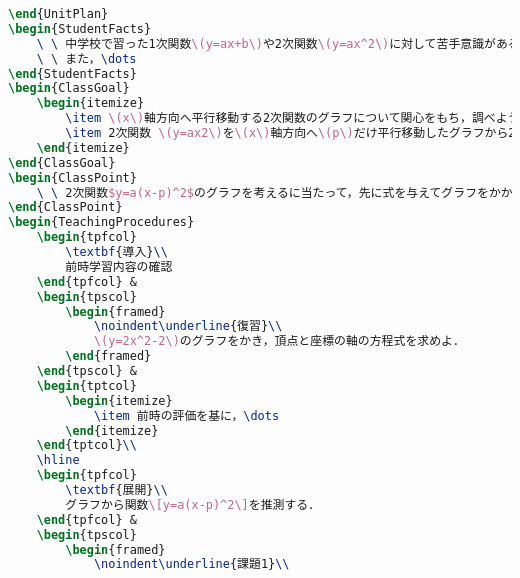 \documentclass[paper=a4,fontsize=10.5pt]{jlreq}
\begin{document}
\begin{lstlisting}[language=TeX]
\end{UnitPlan}
\begin{StudentFacts}
    \ \ 中学校で習った1次関数\(y=ax+b\)や2次関数\(y=ax^2\)に対して苦手意識がある生徒が多く，グラフをかくことができない，関数とグラフの関係が分からないという生徒もいる．\par
    \ \ また，\dots
\end{StudentFacts}
\begin{ClassGoal}
    \begin{itemize}
        \item \(x\)軸方向へ平行移動する2次関数のグラフについて関心をもち，調べようとする．\fbox{C1}
        \item 2次関数 \(y=ax2\)を\(x\)軸方向へ\(p\)だけ平行移動したグラフから2次関数の式を考察できる．\fbox{B1}
    \end{itemize}
\end{ClassGoal}
\begin{ClassPoint}
    \ \ 2次関数$y=a(x-p)^2$のグラフを考えるに当たって，先に式を与えてグラフをかかせることが一般的であるが，\dots
\end{ClassPoint}
\begin{TeachingProcedures}
    \begin{tpfcol}
        \textbf{導入}\\
        前時学習内容の確認
    \end{tpfcol} &
    \begin{tpscol}
        \begin{framed}
            \noindent\underline{復習}\\
            \(y=2x^2-2\)のグラフをかき，頂点と座標の軸の方程式を求めよ．
        \end{framed}
    \end{tpscol} &
    \begin{tptcol}
        \begin{itemize}
            \item 前時の評価を基に，\dots
        \end{itemize}
    \end{tptcol}\\
    \hline
    \begin{tpfcol}
        \textbf{展開}\\
        グラフから関数\[y=a(x-p)^2\]を推測する．
    \end{tpfcol} &
    \begin{tpscol}
        \begin{framed}
            \noindent\underline{課題1}\\

\end{lstlisting}
\end{document}
